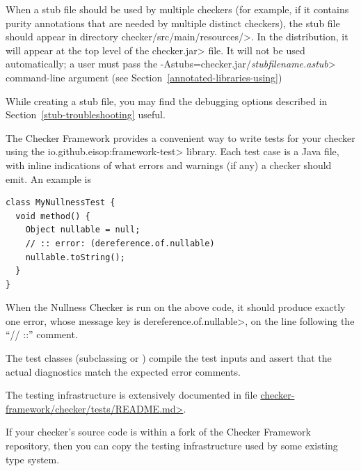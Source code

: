 \begin{itemize}
When a stub file should be used by multiple checkers (for example, if it
contains purity annotations that are needed by multiple distinct checkers),
the stub file should appear in directory \<checker/src/main/resources/>.
In the distribution, it will appear at the top level of the \<checker.jar> file.
It will not be used automatically; a user must pass the
\<-Astubs=checker.jar/\emph{stubfilename.astub}> command-line argument
(see Section~\ref{annotated-libraries-using})

While creating a stub file, you may find the debugging options described in
Section~\ref{stub-troubleshooting} useful.

\end{itemize}



The Checker Framework provides a convenient way to write tests for your
checker using the \<io.github.eisop:framework-test> library.  Each test case
is a Java file, with inline indications of what errors and warnings (if any)
a checker should emit.  An example is

\begin{Verbatim}
class MyNullnessTest {
  void method() {
    Object nullable = null;
    // :: error: (dereference.of.nullable)
    nullable.toString();
  }
}
\end{Verbatim}

\noindent
When the Nullness Checker is run on the above code, it should produce
exactly one error, whose message key is \<dereference.of.nullable>, on
the line following the ``// ::'' comment.

The test classes (subclassing
 or
) compile the test
inputs and assert that the actual diagnostics match the expected error
comments.

The testing infrastructure is extensively documented in file
\href{https://github.com/eisop/checker-framework/blob/master/checker/tests/README.md}{\<checker-framework/checker/tests/README.md>}.

If your checker's source code is within a fork of the Checker Framework
repository, then you can copy the testing infrastructure used by some
existing type system.



